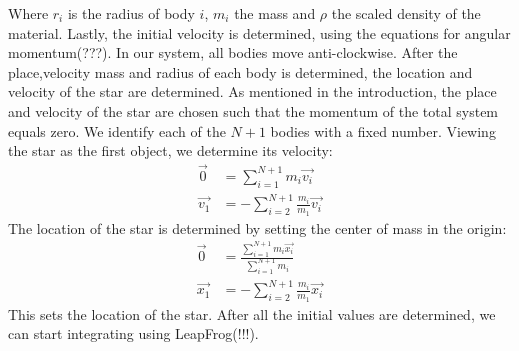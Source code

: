 Where \(r_i\) is the radius of body \(i\), \(m_i\) the mass and \(\rho\) the scaled density of the material.
Lastly, the initial velocity is determined, using the equations for angular momentum(???). 
In our system, all bodies move anti-clockwise. 
After the place,velocity mass and radius of each body is determined, the location and velocity of the star are determined. 
As mentioned in the introduction, the place and velocity of the star are chosen such that the momentum of the total system equals zero.
We identify each of the \(N+1\) bodies with a fixed number. Viewing the star  as the first object, we determine its velocity:
\begin{align*}
	\vec{0}&=\sum_{i=1}^{N+1}m_i\vec{v_i}\\
	\vec{v_1}&=-\sum_{i=2}^{N+1}\frac{m_i}{m_1}\vec{v_i}
\end{align*}
The location of the star is determined by setting the center of mass in the origin:
\begin{align*}
	\vec{0}&=\frac{\sum_{i=1}^{N+1}m_i\vec{x_i}}{\sum_{i=1}^{N+1}m_i}\\
	\vec{x_1}&=-\sum_{i=2}^{N+1}\frac{m_i}{m_1}\vec{x_i}
\end{align*}
This sets the location of the star.
After all the initial values are determined, we can start integrating using LeapFrog(!!!). 

